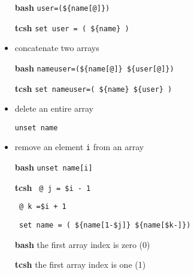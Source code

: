 \documentclass[10pt,t]{beamer}
\begin{document}
\begin{frame}
\begin{itemize}
    \item[\textbf{bash}] \texttt{user=(\$\{name[@]\})}
    \item[\textbf{tcsh}] \texttt{set user = ( \$\{name\} )}
    \framebreak
    \item concatenate two arrays
    \item[\textbf{bash}] \texttt{nameuser=(\$\{name[@]\} \$\{user[@]\})}
    \item[\textbf{tcsh}] \texttt{set nameuser=( \$\{name\} \$\{user\} )}
    \item delete an entire array
    \item[] \texttt{unset name}
    \item remove an element \texttt{i} from an array
    \item[\textbf{bash}] \texttt{unset name[i]}
    \item[\textbf{tcsh}] \texttt{ @ j = \$i - 1}
    \item[ ] \texttt{ @ k =\$i + 1 }
    \item[ ] \texttt{ set name = ( \$\{name[1-\$j]\} \$\{name[\$k-]\})}
    \item[\textbf{bash}] the first array index is zero (0)
    \item[\textbf{tcsh}] the first array index is one (1)
  \end{itemize}
  \framebreak
  \fontsize{5}{5.5}
\end{frame}
\end{document}
